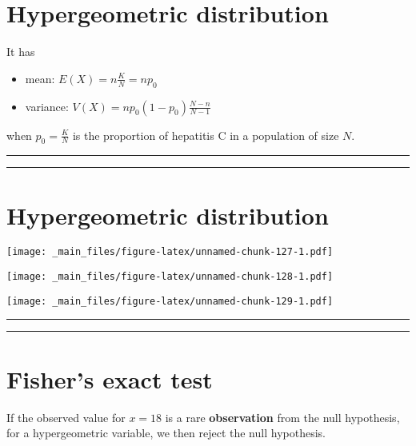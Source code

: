 \documentclass[
]{book}
\begin{document}
\hypertarget{hypergeometric-distribution-1}{%
\section{Hypergeometric distribution}\label{hypergeometric-distribution-1}}

It has

\begin{itemize}
\item
  mean: \(E (X) = n \frac{K}{N} = np_0\)
\item
  variance: \(V(X) = np_0(1-p_0)\frac{N-n}{N-1}\)
\end{itemize}

when \(p_0=\frac{K}{N}\) is the proportion of hepatitis C in a population of size \(N\).

\begin{center}\rule{0.5\linewidth}{0.5pt}\end{center}

\begin{center}\rule{0.5\linewidth}{0.5pt}\end{center}

\hypertarget{hypergeometric-distribution-2}{%
\section{Hypergeometric distribution}\label{hypergeometric-distribution-2}}

\texttt{[image: \_main\_files/figure-latex/unnamed-chunk-127-1.pdf]}

\texttt{[image: \_main\_files/figure-latex/unnamed-chunk-128-1.pdf]}

\texttt{[image: \_main\_files/figure-latex/unnamed-chunk-129-1.pdf]}

\begin{center}\rule{0.5\linewidth}{0.5pt}\end{center}

\begin{center}\rule{0.5\linewidth}{0.5pt}\end{center}

\hypertarget{fishers-exact-test-2}{%
\section{Fisher's exact test}\label{fishers-exact-test-2}}

If the observed value for \(x=18\) is a rare \textbf{observation} from the null hypothesis, for a hypergeometric variable, we then reject the null hypothesis.
\end{document}
